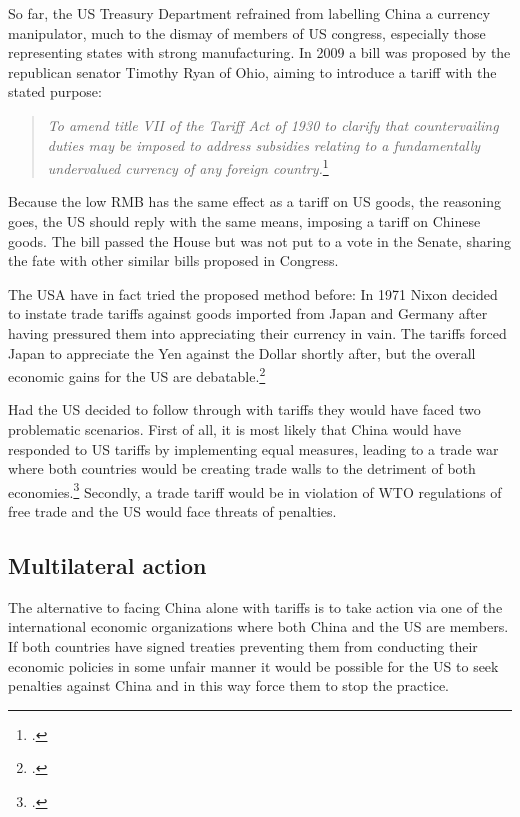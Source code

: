 So far, the US Treasury Department refrained from labelling China a 
currency manipulator, much to the dismay of members of US congress, 
especially those representing states with strong manufacturing.
In 2009 a bill was proposed by the republican senator Timothy Ryan of 
Ohio, aiming to introduce a tariff with the stated purpose:

\begin{quotation}
\textit{To amend title VII of the Tariff Act of 1930 to clarify that 
countervailing duties may be imposed to address subsidies relating to a 
fundamentally undervalued currency of any foreign 
country.}\footnote{\cite{Ryan2009}.}
\end{quotation}

Because the low RMB has the same effect as a tariff on US 
goods, the reasoning goes, the US should reply with the same means, 
imposing a tariff on Chinese goods. The bill passed the House but was 
not put to a vote in the Senate, sharing the fate with other similar 
bills proposed in Congress. 

The USA have in fact tried the proposed method before: In 1971 Nixon decided to instate trade 
tariffs against goods imported from Japan and Germany after having 
pressured them into appreciating their currency in vain. The tariffs 
forced Japan to appreciate the Yen against the Dollar shortly after, but 
the overall economic gains for the US are debatable.\footnote{\cite{kuroda2004}.} 

Had the US decided to follow through with tariffs they would have faced 
two problematic scenarios. First of all, it is most likely that China 
would have responded to US tariffs by implementing equal measures, 
leading to a trade war where both countries would be creating trade 
walls to the detriment of both economies.\footnote{\cite{Levy2010}.} 
Secondly, a trade tariff would be in violation of WTO regulations of 
free trade and the US would face threats of penalties. 

\subsection{Multilateral action}

The alternative to facing China alone with tariffs is to take action via 
one of the international economic organizations where both China and the 
US are members. If both countries have signed treaties preventing them 
from conducting their economic policies in some unfair manner it would 
be possible for the US to seek penalties against China and in this way 
force them to stop the practice.

